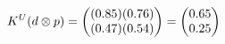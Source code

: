 \documentclass[preview]{standalone}
\begin{document}
\begin{align*}
\special{dvisvgm:raw <g id='unique000'>}K^U(d \otimes p) = \begin{pmatrix} (0.85)(0.76) \\ (0.47)(0.54) \end{pmatrix} = \begin{pmatrix} 0.65 \\ 0.25 \end{pmatrix}\special{dvisvgm:raw </g>}
\end{align*}
\end{document}
